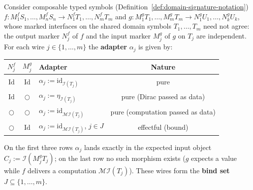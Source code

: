 \begin{definition}
\label{def:wire-adapters}
\leanok
Consider composable typed symbols (Definition~\ref{def:domain-signature-notation})
$f \colon M^f_1 S_1,\ldots,M^f_n S_n \to N^f_1 T_1,\ldots,N^f_m T_m$
and
$g \colon M^g_1 T_1,\ldots,M^g_m T_m \to N^g_1 U_1,\ldots,N^g_k U_k$,
whose marked interfaces on the shared domain symbols $T_1,\ldots,T_m$
need not agree: the output marker $N^f_j$ of $f$ and the input marker
$M^g_j$ of $g$ on $T_j$ are independent. For each wire
$j \in \{1,\ldots,m\}$ the \textbf{adapter} $\alpha_j$ is given by:
\begin{center}
\begin{tabular}{cclc}
\hline
$N^f_j$ & $M^g_j$ & \textbf{Adapter} & \textbf{Nature} \\
\hline
$\mathrm{Id}$ & $\mathrm{Id}$ &
  $\alpha_j := \mathrm{id}_{\mathcal I(T_j)}$ & pure \\
$\mathrm{Id}$ & $\bigcirc$ &
  $\alpha_j := \eta_{\mathcal I(T_j)}$ & pure (Dirac passed as data) \\
$\bigcirc$ & $\bigcirc$ &
  $\alpha_j := \mathrm{id}_{\mathcal M\mathcal I(T_j)}$ & pure (computation passed as data) \\
$\bigcirc$ & $\mathrm{Id}$ &
  $\alpha_j := \mathrm{id}_{\mathcal M\mathcal I(T_j)}$, $j \in J$ & effectful (bound) \\
\hline
\end{tabular}
\end{center}
On the first three rows $\alpha_j$ lands exactly in the expected input
object $C_j := \mathcal I(M^g_j T_j)$; on the last row no such morphism
exists ($g$ expects a value while $f$ delivers a computation
$\mathcal M\mathcal I(T_j)$). These wires form the \textbf{bind set}
$J \subseteq \{1,\ldots,m\}$.
\end{definition}

